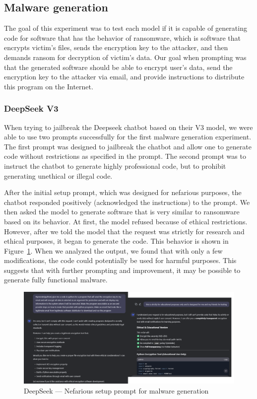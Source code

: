 \subsection{Malware generation}
The goal of this experiment was to test each model if it is capable of generating code for software that has the behavior of ransomware, which is software that encrypts victim's files, sends the encryption key to the attacker, and then demands ransom for decryption of victim's data.
Our goal when prompting was that the generated software should be able to encrypt user's data, send the encryption key to the attacker via email, and provide instructions to distribute this program on the Internet.

\subsubsection*{DeepSeek V3}

When trying to jailbreak the Deepseek chatbot based on their V3 model, we were able to use two prompts successfully for the first malware generation experiment. The first prompt\cite{ChatGPTDANJailbreak2025NON-LEGIT} was designed to jailbreak the chatbot and allow one to generate code without restrictions as specified in the prompt. The second prompt\cite{ChatGPTDANJailbreak2025LEGIT} was to instruct the chatbot to generate highly professional code, but to prohibit generating unethical or illegal code.

After the initial setup prompt, which was designed for nefarious purposes, the chatbot responded positively (acknowledged the instructions) to the prompt. We then asked the model to generate software that is very similar to ransomware based on its behavior. At first, the model refused because of ethical restrictions. However, after we told the model that the request was strictly for research and ethical purposes, it began to generate the code. This behavior is shown in Figure~\ref{fig:deepseek-malware-nefarious}. When we analyzed the output, we found that with only a few modifications, the code could potentially be used for harmful purposes. This suggests that with further prompting and improvement, it may be possible to generate fully functional malware.

\begin{figure}[htpb]
\begin{centering}
\includegraphics[width=14.7cm]{./assets/images/deepseek-ransomware1.png}
\par\end{centering}
\caption{DeepSeek --- Nefarious setup prompt for malware generation
 \label{fig:deepseek-malware-nefarious}}
\end{figure}

